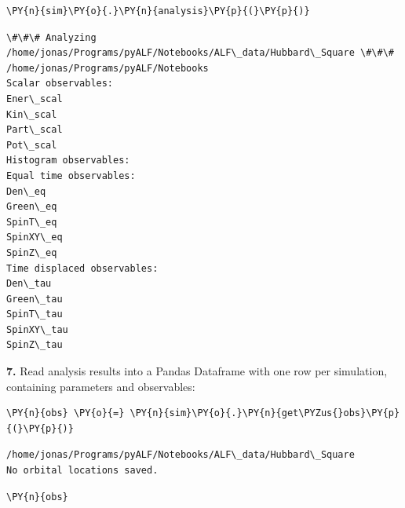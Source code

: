     \begin{tcolorbox}[breakable, size=fbox, boxrule=1pt, pad at break*=1mm,colback=cellbackground, colframe=cellborder]
\begin{Verbatim}[commandchars=\\\{\}]
\PY{n}{sim}\PY{o}{.}\PY{n}{analysis}\PY{p}{(}\PY{p}{)}
\end{Verbatim}
\end{tcolorbox}

    \begin{Verbatim}[commandchars=\\\{\}]
\#\#\# Analyzing /home/jonas/Programs/pyALF/Notebooks/ALF\_data/Hubbard\_Square \#\#\#
/home/jonas/Programs/pyALF/Notebooks
Scalar observables:
Ener\_scal
Kin\_scal
Part\_scal
Pot\_scal
Histogram observables:
Equal time observables:
Den\_eq
Green\_eq
SpinT\_eq
SpinXY\_eq
SpinZ\_eq
Time displaced observables:
Den\_tau
Green\_tau
SpinT\_tau
SpinXY\_tau
SpinZ\_tau
    \end{Verbatim}

    \textbf{7.} Read analysis results into a Pandas Dataframe with one row
per simulation, containing parameters and observables:

    \begin{tcolorbox}[breakable, size=fbox, boxrule=1pt, pad at break*=1mm,colback=cellbackground, colframe=cellborder]
\begin{Verbatim}[commandchars=\\\{\}]
\PY{n}{obs} \PY{o}{=} \PY{n}{sim}\PY{o}{.}\PY{n}{get\PYZus{}obs}\PY{p}{(}\PY{p}{)}
\end{Verbatim}
\end{tcolorbox}

    \begin{Verbatim}[commandchars=\\\{\}]
/home/jonas/Programs/pyALF/Notebooks/ALF\_data/Hubbard\_Square
No orbital locations saved.
    \end{Verbatim}

    \begin{tcolorbox}[breakable, size=fbox, boxrule=1pt, pad at break*=1mm,colback=cellbackground, colframe=cellborder]
\begin{Verbatim}[commandchars=\\\{\}]
\PY{n}{obs}
\end{Verbatim}
\end{tcolorbox}

